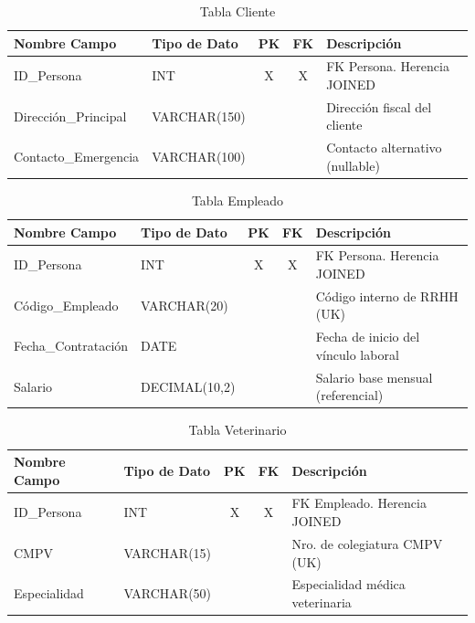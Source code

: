 \begin{table}[H]
\centering
\footnotesize
\begin{tabular}{|l|l|c|c|p{5cm}|}
\hline
\textbf{Nombre Campo} & \textbf{Tipo de Dato} & \textbf{PK} & \textbf{FK} & \textbf{Descripción} \\
\hline
ID\_Persona & INT & X & X & FK Persona. Herencia JOINED \\
\hline
Dirección\_Principal & VARCHAR(150) & & & Dirección fiscal del cliente \\
\hline
Contacto\_Emergencia & VARCHAR(100) & & & Contacto alternativo (nullable) \\
\hline
\end{tabular}
\caption{Tabla Cliente}
\end{table}

\begin{table}[H]
\centering
\footnotesize
\begin{tabular}{|l|l|c|c|p{5cm}|}
\hline
\textbf{Nombre Campo} & \textbf{Tipo de Dato} & \textbf{PK} & \textbf{FK} & \textbf{Descripción} \\
\hline
ID\_Persona & INT & X & X & FK Persona. Herencia JOINED \\
\hline
Código\_Empleado & VARCHAR(20) & & & Código interno de RRHH (UK) \\
\hline
Fecha\_Contratación & DATE & & & Fecha de inicio del vínculo laboral \\
\hline
Salario & DECIMAL(10,2) & & & Salario base mensual (referencial) \\
\hline
\end{tabular}
\caption{Tabla Empleado}
\end{table}

\begin{table}[H]
\centering
\footnotesize
\begin{tabular}{|l|l|c|c|p{5cm}|}
\hline
\textbf{Nombre Campo} & \textbf{Tipo de Dato} & \textbf{PK} & \textbf{FK} & \textbf{Descripción} \\
\hline
ID\_Persona & INT & X & X & FK Empleado. Herencia JOINED \\
\hline
CMPV & VARCHAR(15) & & & Nro. de colegiatura CMPV (UK) \\
\hline
Especialidad & VARCHAR(50) & & & Especialidad médica veterinaria \\
\hline
\end{tabular}
\caption{Tabla Veterinario}
\end{table}

